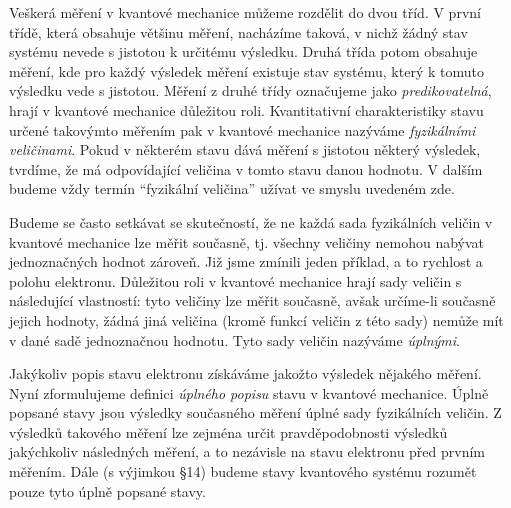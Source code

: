 Veškerá měření v kvantové mechanice můžeme rozdělit do dvou tříd. V první třídě, která obsahuje většinu měření, nacházíme taková, v nichž žádný stav systému nevede s jistotou k určitému výsledku. Druhá třída potom obsahuje měření, kde pro každý výsledek měření existuje stav systému, který k tomuto výsledku vede s jistotou. Měření z druhé třídy označujeme jako \emph{predikovatelná}, hrají v kvantové mechanice důležitou roli. Kvantitativní charakteristiky stavu určené takovýmto měřením pak v kvantové mechanice nazýváme \emph{fyzikálními veličinami}. Pokud v některém stavu dává měření s jistotou některý výsledek, tvrdíme, že má odpovídající veličina v tomto stavu danou hodnotu. V dalším budeme vždy termín ``fyzikální veličina'' užívat ve smyslu uvedeném zde.\par
Budeme se často setkávat se skutečností, že ne každá sada fyzikálních veličin v kvantové mechanice lze měřit současně, tj. všechny veličiny nemohou nabývat jednoznačných hodnot zároveň. Již jsme zmínili jeden příklad, a to rychlost a polohu elektronu. Důležitou roli v kvantové mechanice hrají sady veličin s následující vlastností: tyto veličiny lze měřit současně, avšak určíme-li současně jejich hodnoty, žádná jiná veličina (kromě funkcí veličin z této sady) nemůže mít v dané sadě jednoznačnou hodnotu. Tyto sady veličin nazýváme \emph{úplnými}.\par
Jakýkoliv popis stavu elektronu získáváme jakožto výsledek nějakého měření. Nyní zformulujeme definici \emph{úplného popisu} stavu v kvantové mechanice. Úplně popsané stavy jsou výsledky současného měření úplné sady fyzikálních veličin. Z výsledků takového měření lze zejména určit pravděpodobnosti výsledků jakýchkoliv následných měření, a to nezávisle na stavu elektronu před prvním měřením. Dále (s výjimkou §14) budeme stavy kvantového systému rozumět pouze tyto úplně popsané stavy.
